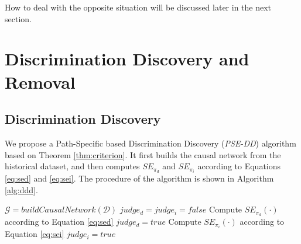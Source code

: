 \documentclass[letterpaper]{article}
\begin{document}
How to deal with the opposite situation will be discussed later in the next section.

\section{Discrimination Discovery and Removal}

\subsection{Discrimination Discovery}
We propose a Path-Specific based Discrimination Discovery (\emph{PSE-DD}) algorithm based on Theorem \ref{thm:criterion}. It first builds the causal network from the historical dataset, and then computes $SE_{\pi_{d}}$ and $SE_{\pi_{i}}$ according to Equations \eqref{eq:sed} and \eqref{eq:sei}. The procedure of the algorithm is shown in Algorithm \ref{alg:ddd}. %

\begin{algorithm}
\SetAlgoVlined
\small
		
		$\mathcal{G}=buildCausalNetwork(\mathcal{D})$\;
		$judge_d = judge_i = false$\;
		Compute $SE_{\pi_{d}}(\cdot)$ according to Equation \eqref{eq:sed}\;
		 {
			$judge_d = true$\;
		}
		Compute $SE_{\pi_{i}}(\cdot)$ according to Equation \eqref{eq:sei}\;
		 {
			$judge_i = true$\;
		}
		\;
    \caption{\emph{PSE-DD}}
		\label{alg:ddd}
\end{algorithm}
\end{document}
